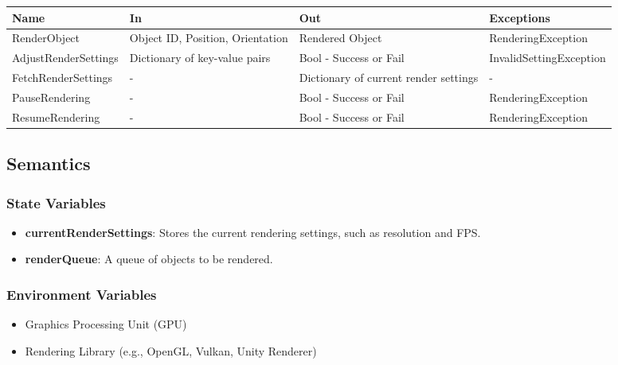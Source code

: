 \documentclass[12pt, titlepage]{article}
\begin{document}
\begin{center}
  \begin{tabular}{p{4cm} p{4cm} p{4cm} p{4cm}}
    \hline
    \textbf{Name}        & \textbf{In}                      & \textbf{Out}                          & \textbf{Exceptions}     \\
    \hline
    RenderObject         & Object ID, Position, Orientation & Rendered Object                       & RenderingException      \\
    \hline
    AdjustRenderSettings & Dictionary of key-value pairs    & Bool - Success or Fail                & InvalidSettingException \\
    \hline
    FetchRenderSettings  & -                                & Dictionary of current render settings & -                       \\
    \hline
    PauseRendering       & -                                & Bool - Success or Fail                & RenderingException      \\
    \hline
    ResumeRendering      & -                                & Bool - Success or Fail                & RenderingException      \\
    \hline
  \end{tabular}
\end{center}

\subsection{Semantics}

\subsubsection{State Variables}

\begin{itemize}
  \item \textbf{currentRenderSettings}: Stores the current rendering settings, such as resolution and FPS.
  \item \textbf{renderQueue}: A queue of objects to be rendered.
\end{itemize}

\subsubsection{Environment Variables}

\begin{itemize}
  \item Graphics Processing Unit (GPU)
  \item Rendering Library (e.g., OpenGL, Vulkan, Unity Renderer)
\end{itemize}
\end{document}
